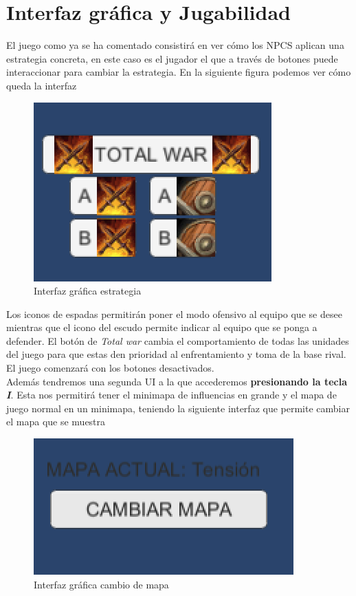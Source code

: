 \section{Interfaz gráfica y Jugabilidad}
El juego como ya se ha comentado consistirá en ver cómo los NPCS aplican una estrategia concreta, en este caso es el jugador el que a través de botones puede interaccionar para cambiar la estrategia. En la siguiente figura podemos ver cómo queda la interfaz
\begin{figure}[H]
    \centering
    \includegraphics{buttons1.png}
    \caption{Interfaz gráfica estrategia}
    \label{fig:mainButtons}
\end{figure}
Los iconos de espadas permitirán poner el modo ofensivo al equipo que se desee mientras que el icono del escudo permite indicar al equipo que se ponga a defender. El botón de \textit{Total war} cambia el comportamiento de todas las unidades del juego para que estas den prioridad al enfrentamiento y toma de la base rival. El juego comenzará con los botones desactivados. \\

Además tendremos una segunda UI a la que accederemos \textbf{presionando la tecla \textit{I}}. Esta nos permitirá tener el minimapa de influencias en grande y el mapa de juego normal en un minimapa, teniendo la siguiente interfaz que permite cambiar el mapa que se muestra \begin{figure}[H]
    \centering
    \includegraphics{buttons2.png}
    \caption{Interfaz gráfica cambio de mapa}
    \label{fig:mainButtons}
\end{figure}
